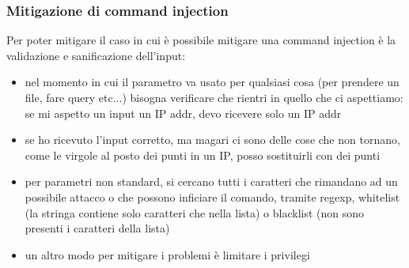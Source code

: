 \documentclass{article}
\begin{document}
\subsubsection{Mitigazione di command injection}
Per poter mitigare il caso in cui è possibile mitigare una command injection è la validazione e sanificazione dell'input:
\begin{itemize}
\item nel momento in cui il parametro va usato per qualsiasi cosa (per prendere un file, fare query etc...) bisogna verificare che rientri in quello che ci aspettiamo: se mi aspetto un input un IP addr, devo ricevere solo un IP addr
\item se ho ricevuto l'input corretto, ma magari ci sono delle cose che non tornano, come le virgole al posto dei punti in un IP, posso sostituirli con dei punti
\item per parametri non standard, si cercano tutti i caratteri che rimandano ad un possibile attacco o che possono inficiare il comando, tramite regexp, whitelist (la stringa contiene solo caratteri che nella lista) o blacklist (non sono presenti i caratteri della lista)
\item un altro modo per mitigare i problemi è limitare i privilegi
\end{itemize}
\end{document}
